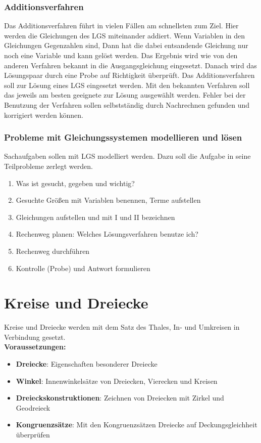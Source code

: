 \documentclass{article}
\begin{document}
\subsubsection*{Additionsverfahren}
Das Additionsverfahren führt in vielen Fällen am schnellsten zum Ziel. Hier werden die Gleichungen des LGS miteinander addiert. Wenn Variablen in den Gleichungen Gegenzahlen sind, Dann hat die dabei entsandende Gleichung nur noch eine Variable und kann gelöst werden.
Das Ergebnis wird wie von den anderen Verfahren bekannt in die Ausgangsgleichung eingesetzt. Danach wird das Lösungspaar durch eine Probe auf Richtigkeit überprüft.
Das Additionsverfahren soll zur Lösung eines LGS eingesetzt werden. Mit den bekannten Verfahren soll das jeweils am besten geeignete zur Lösung ausgewählt werden. 
Fehler bei der Benutzung der Verfahren sollen selbstständig durch Nachrechnen gefunden und korrigiert werden können.
\subsubsection*{Probleme mit Gleichungssystemen modellieren und lösen}
Sachaufgaben sollen mit LGS modelliert werden. Dazu soll die Aufgabe in seine Teilprobleme zerlegt werden.
\begin{enumerate}
    \item Was ist gesucht, gegeben und wichtig?
    \item Gesuchte Größen mit Variablen benennen, Terme aufstellen
    \item Gleichungen aufstellen und mit I und II bezeichnen
    \item Rechenweg planen: Welches Lösungsverfahren benutze ich?
    \item Rechenweg durchführen
    \item Kontrolle (Probe) und Antwort formulieren
\end{enumerate}
\newpage
\section{Kreise und Dreiecke}
Kreise und Dreiecke werden mit dem Satz des Thales, In- und Umkreisen in Verbindung gesetzt.\\
\textbf{Voraussetzungen: }
\begin{itemize}
    \item \textbf{Dreiecke}: Eigenschaften besonderer Dreiecke
    \item \textbf{Winkel}: Innenwinkelsätze von Dreiecken, Vierecken und Kreisen
    \item \textbf{Dreieckskonstruktionen}: Zeichnen von Dreiecken mit Zirkel und Geodreieck
    \item \textbf{Kongruenzsätze}: Mit den Kongruenzsätzen Dreiecke auf Deckungsgleichheit überprüfen
\end{itemize}
\end{document}
